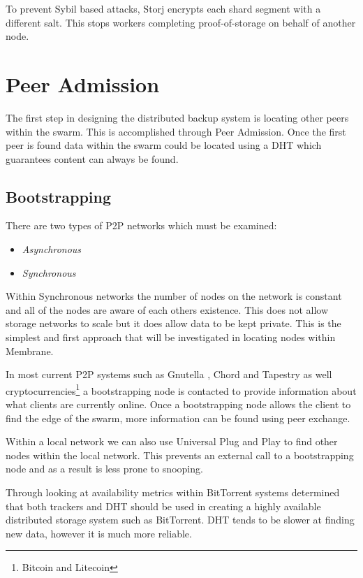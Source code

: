 \documentclass[11pt, a4paper, twoside]{report}
\begin{document}
To prevent Sybil based attacks, Storj encrypts each shard segment with a different salt. This stops workers completing proof-of-storage on behalf of another node.

\section{Peer Admission}

The first step in designing the distributed backup system is locating other peers within the swarm. This is accomplished through Peer Admission. Once the first peer is found data within the swarm could be located using a DHT which guarantees content can always be found.

\subsection{Bootstrapping}

There are two types of P2P networks which must be examined:

\begin{itemize}
 \item \emph{Asynchronous}
 \item \emph{Synchronous}
\end{itemize}

Within Synchronous networks the number of nodes on the network is constant and all of the nodes are aware of each others existence. This does not allow storage networks to scale but it does allow data to be kept private. \citep{saxena2003admission} This is the simplest and first approach that will be investigated in locating nodes within Membrane.

In most current P2P systems such as Gnutella \citep{klingberg2002gnutella}, Chord and Tapestry as well cryptocurrencies\footnote{Bitcoin and Litecoin} a bootstrapping node is contacted to provide information about what clients are currently online. Once a bootstrapping node allows the client to find the edge of the swarm, more information can be found using peer exchange.

Within a local network we can also use Universal Plug and Play to find other nodes within the local network. This prevents an external call to a bootstrapping node and as a result is less prone to snooping.

Through looking at availability metrics within BitTorrent systems \cite{neglia2007availability} determined that both trackers and DHT should be used in creating a highly available distributed storage system such as BitTorrent. DHT tends to be slower at finding new data, however it is much more reliable.
\end{document}
